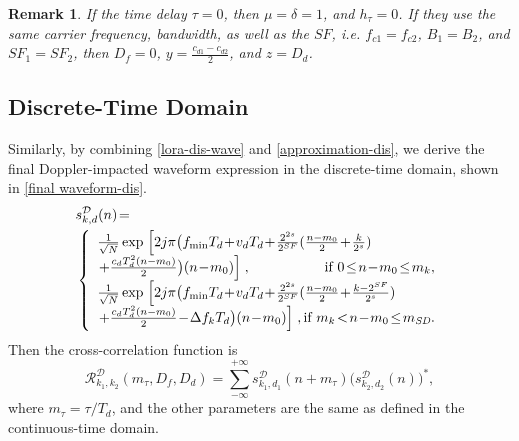 \documentclass{IEEEtaes}
\theoremstyle{plain}
\newtheorem{remark}{Remark}
\begin{document}
\begin{remark}
If the time delay $\tau=0$, then $\mu = \delta = 1$, and $h_\tau=0$.
If they use the same carrier frequency, bandwidth, as well as the $SF$, i.e. $f_{c1} = f_{c2}$, $B_1 = B_2$, and $SF_1 = SF_2$, then $D_f=0$, $y = \frac{c_{d1}-c_{d2}}{2}$, and $z = D_d$. 
\end{remark}


\subsection{Discrete-Time Domain}
Similarly, by combining \eqref{lora-dis-wave} and \eqref{approximation-dis}, we derive the final Doppler-impacted waveform expression in the discrete-time domain, shown in \eqref{final waveform-dis}. 
\begin{equation}
  \label{final waveform-dis}
\begin{aligned}
&s^\mathcal{D} _{k,d}(n) \!=\!\\ &\left\{
\begin{array}{*{2}{ll}}
\frac{1}{\sqrt{N}}\exp \left. \Big[ 2j\pi\big(f_{\min}T_d\!+\!v_dT_d\!+\!\frac{2^{2s}}{2^{SF}}(\frac{n-m_0}{2} \!+\!\frac{k}{2^s} )\right.\\ 
\left. +\frac{c_dT_d^2(n-m_0)}{2}\big)(n\!-\!m_0)\Big]\right.,  \hfill \text{if $0\!\le\! n\!-\!m_0 \!\le\! m_k$},\\
\frac{1}{\sqrt{N}}\exp \left. \Big[ 2j\pi\big(f_{\min}T_d\!+\!v_dT_d\!+\!\frac{2^{2s}}{2^{SF}}(\frac{n-m_0}{2} \!+\!\frac{k-2^{SF}}{2^s} )\right.\\ 
\left. +\frac{c_dT_d^2(n-m_0)}{2}\!-\!\Delta f_kT_d\big)(n\!-\!m_0)\Big]\right., \hfill \text{if $m_k \!<\!  n\!-\!m_0 \!\le\! m_{\textit{SD}}$}.\\
\end{array} 
\right.
\end{aligned}
\end{equation}
Then the cross-correlation function is 
\begin{equation}
  \label{cross-dis}
  \mathcal{R}^\mathcal{D} _{k_1,k_2}(m_\tau,D_f,D_d)=\sum_{-\infty }^{+\infty} s^\mathcal{D}_{k_1,d_1}(n+m_\tau )\Big(s^\mathcal{D}_{k_2,d_2}(n)\Big)^*,  
\end{equation}
where $m_\tau = \tau/T_d$, and the other parameters are the same as defined in the continuous-time domain.
\end{document}

